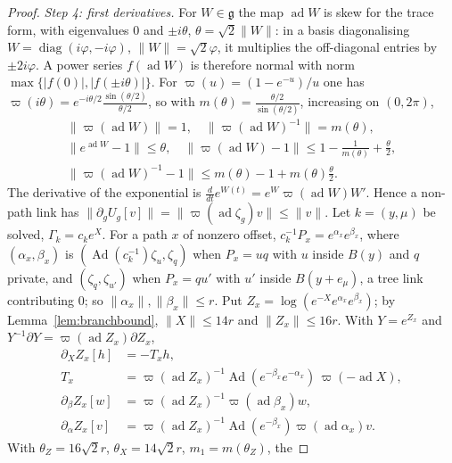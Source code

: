 \documentclass[11pt]{amsart}
\theoremstyle{definition}
\theoremstyle{remark}
\numberwithin{equation}{section}
\newcommand{\g}{\mathfrak{g}}
\begin{document}
\begin{proof}
\emph{Step 4: first derivatives.} For $W\in\g$ the map
$\operatorname{ad}W$ is skew for the trace form, with eigenvalues $0$ and
$\pm i\theta$, $\theta=\sqrt2\lVert W\rVert$: in a basis diagonalising
$W=\operatorname{diag}(i\varphi,-i\varphi)$, $\lVert W\rVert=\sqrt2\varphi$,
it multiplies the off-diagonal entries by $\pm2i\varphi$. A power series
$f(\operatorname{ad}W)$ is therefore normal with norm $\max\{\lvert f(0)
\rvert,\lvert f(\pm i\theta)\rvert\}$. For
$\varpi(u)=(1-e^{-u})/u$ one has $\varpi(i\theta)=e^{-i\theta/2}
\frac{\sin(\theta/2)}{\theta/2}$, so with $m(\theta)=\frac{\theta/2}
{\sin(\theta/2)}$, increasing on $(0,2\pi)$,
\begin{gather*}
\lVert\varpi(\operatorname{ad}W)\rVert=1,\quad
\lVert\varpi(\operatorname{ad}W)^{-1}\rVert=m(\theta),\\
\lVert e^{\operatorname{ad}W}-1\rVert\le\theta,\quad
\lVert\varpi(\operatorname{ad}W)-1\rVert\le1-\tfrac1{m(\theta)}+
\tfrac\theta2,\\
\lVert\varpi(\operatorname{ad}W)^{-1}-1\rVert\le m(\theta)-1+m(\theta)
\tfrac\theta2 .
\end{gather*}
The derivative of the exponential is $\frac d{dt}e^{W(t)}=e^{W}\varpi(
\operatorname{ad}W)W'$. Hence a non-path link has
$\lVert\partial_gU_g[v]\rVert=\lVert\varpi(\operatorname{ad}\zeta_g)v\rVert
\le\lVert v\rVert$. Let $k=(y,\mu)$ be solved, $\Gamma_k=c_ke^X$. For a
path $x$ of nonzero offset, $c_k^{-1}P_x=e^{\alpha_x}e^{\beta_x}$, where
$(\alpha_x,\beta_x)$ is $(\operatorname{Ad}(c_k^{-1})\zeta_u,\zeta_q)$
when $P_x=uq$ with $u$ inside $B(y)$ and $q$ private, and
$(\zeta_q,\zeta_{u'})$ when $P_x=qu'$ with $u'$ inside $B(y+e_\mu)$, a
tree link contributing $0$; so $\lVert\alpha_x\rVert,\lVert\beta_x\rVert
\le r$. Put $Z_x=\log(e^{-X}e^{\alpha_x}e^{\beta_x})$; by
Lemma~\ref{lem:branchbound}, $\lVert X\rVert\le14r$ and $\lVert Z_x\rVert
\le16r$. With $Y=e^{Z_x}$ and $Y^{-1}\partial Y=\varpi(\operatorname{ad}
Z_x)\partial Z_x$,
\begin{align*}
\partial_XZ_x[h]&=-T_xh,\\
T_x&=\varpi(\operatorname{ad}Z_x)^{-1}
\operatorname{Ad}(e^{-\beta_x}e^{-\alpha_x})\,\varpi(-\operatorname{ad}X),\\
\partial_{\beta}Z_x[w]&=\varpi(\operatorname{ad}Z_x)^{-1}\varpi(
\operatorname{ad}\beta_x)w,\\
\partial_{\alpha}Z_x[v]&=\varpi(\operatorname{ad}Z_x)^{-1}
\operatorname{Ad}(e^{-\beta_x})\varpi(\operatorname{ad}\alpha_x)v .
\end{align*}
With $\theta_Z=16\sqrt2r$, $\theta_X=14\sqrt2r$, $m_1=m(\theta_Z)$, the

\end{proof}
\end{document}
